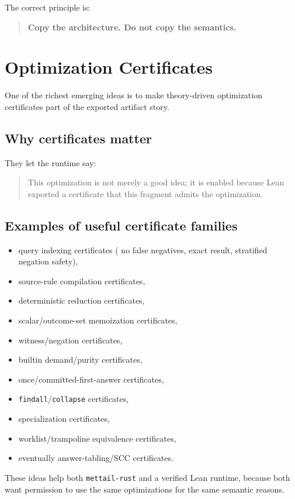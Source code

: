 \documentclass[11pt]{article}
\begin{document}
The correct principle is:
\begin{quote}
\textbf{Copy the architecture. Do not copy the semantics.}
\end{quote}

\section{Optimization Certificates}

One of the richest emerging ideas is to make theory-driven optimization certificates part of the exported artifact story.

\subsection{Why certificates matter}
They let the runtime say:
\begin{quote}
This optimization is not merely a good idea; it is enabled because Lean exported a certificate that this fragment admits the optimization.
\end{quote}

\subsection{Examples of useful certificate families}
\begin{itemize}
  \item query indexing certificates (
    no false negatives, exact result, stratified negation safety),
  \item source-rule compilation certificates,
  \item deterministic reduction certificates,
  \item scalar/outcome-set memoization certificates,
  \item witness/negation certificates,
  \item builtin demand/purity certificates,
  \item once/committed-first-answer certificates,
  \item \texttt{findall}/\texttt{collapse} certificates,
  \item specialization certificates,
  \item worklist/trampoline equivalence certificates,
  \item eventually answer-tabling/SCC certificates.
\end{itemize}

These ideas help both \texttt{mettail-rust} and a verified Lean runtime, because both want permission to use the same optimizations for the same semantic reasons.
\end{document}
